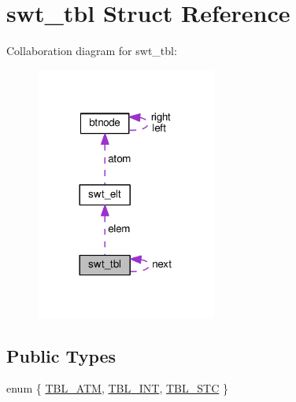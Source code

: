 \hypertarget{structswt__tbl}{}\section{swt\+\_\+tbl Struct Reference}
\label{structswt__tbl}


Collaboration diagram for swt\+\_\+tbl\+:\nopagebreak
\begin{figure}[H]
\begin{center}
\leavevmode
\includegraphics[width=168pt]{structswt__tbl__coll__graph}
\end{center}
\end{figure}
\subsection*{Public Types}
\begin{DoxyCompactItemize}
\item 
enum \{ \hyperlink{structswt__tbl_a6e6eca39872e41e6d834af855ee073b9a9979be59e93bb9517315fe353aebf466}{T\+B\+L\+\_\+\+A\+TM}, 
\hyperlink{structswt__tbl_a6e6eca39872e41e6d834af855ee073b9ac49b02876988472249b0cc3d3284f978}{T\+B\+L\+\_\+\+I\+NT}, 
\hyperlink{structswt__tbl_a6e6eca39872e41e6d834af855ee073b9a16aba2ede4f71ce75ff29849da0a1c6a}{T\+B\+L\+\_\+\+S\+TC}
 \}
\end{DoxyCompactItemize}

